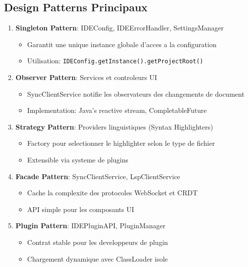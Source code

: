 \documentclass[11pt,a4paper,hidelinks]{book}
\begin{document}
\subsection{Design Patterns Principaux}

\begin{enumerate}
    
    \item \textbf{Singleton Pattern}: IDEConfig, IDEErrorHandler, SettingsManager
    \begin{itemize}
        \item Garantit une unique instance globale d'acces a la configuration
        \item Utilisation: \texttt{IDEConfig.getInstance().getProjectRoot()}
    \end{itemize}
    
    \item \textbf{Observer Pattern}: Services et controleurs UI
    \begin{itemize}
        \item SyncClientService notifie les observateurs des changements de document
        \item Implementation: Java's reactive stream, CompletableFuture
    \end{itemize}
    
    \item \textbf{Strategy Pattern}: Providers linguistiques (Syntax Highlighters)
    \begin{itemize}
        \item Factory pour selectionner le highlighter selon le type de fichier
        \item Extensible via systeme de plugins
    \end{itemize}
    
    \item \textbf{Facade Pattern}: SyncClientService, LspClientService
    \begin{itemize}
        \item Cache la complexite des protocoles WebSocket et CRDT
        \item API simple pour les composants UI
    \end{itemize}
    
    \item \textbf{Plugin Pattern}: IDEPluginAPI, PluginManager
    \begin{itemize}
        \item Contrat stable pour les developpeurs de plugin
        \item Chargement dynamique avec ClassLoader isole
    \end{itemize}

\end{enumerate}
\end{document}
